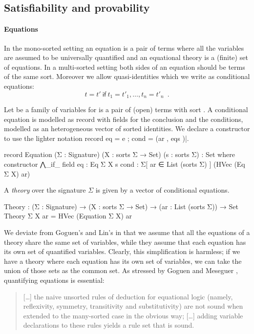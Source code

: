 \subsection{Satisfiability and provability}

\paragraph{Equations} In the mono-sorted setting an equation is a pair
of terms where all the variables are assumed to be universally
quantified and an equational theory is a (finite) set of equations.
In a  multi-sorted setting both sides of an equation should be terms
of the same sort. Moreover we allow quasi-identities which we
write as conditional equations:
\[ t = t'\ \mathsf{if} \  t_1 = t'_1, \ldots, t_n = t'_n \enspace . \] 

Let  be a family of
variables for  is a pair of (open)
terms with sort . A conditional equation is modelled as record with
fields for the conclusion and the conditions, modelled as an
heterogeneous vector of sorted identities. We declare a constructor
to use the lighter notation record {
  eq = e ; cond = (ar , eqs )}|. 
\begin{spec}
record Equation (Σ : Signature) (X : sorts Σ → Set) (s : sorts Σ) : Set where
  constructor ⋀_if_
  field
    eq     :   Eq Σ X s
    cond   :   Σ[ ar ∈ List (sorts Σ) ] (HVec (Eq Σ X) ar)
\end{spec}
\noindent A \emph{theory} over the signature $\Sigma$ is given by a
vector of conditional equations.
\begin{spec}
Theory : (Σ : Signature) → (X : sorts Σ → Set) → (ar : List (sorts Σ)) → Set
Theory Σ X ar = HVec (Equation Σ X) ar
\end{spec}
We deviate from Goguen's and Lin's in that we assume that all the
equations of a theory share the same set of variables, while they
assume that each equation has its own set of quantified
variables. Clearly, this simplification is harmless; if we have a
theory where each equation has its own set of variables, we can take
the union of those sets as the common set. As stressed by Goguen and
Meseguer \cite{goguen-remarks-87}, quantifying equations is essential:
\begin{quote}
  [\ldots] the naive unsorted rules of deduction for equational logic
  (namely, reflexivity, symmetry, transitivity and substitutivity) are
  not sound when extended to the many-sorted case in the obvious way;
  [\ldots] adding variable declarations to these rules
  yields a rule set that is sound.
\end{quote}

